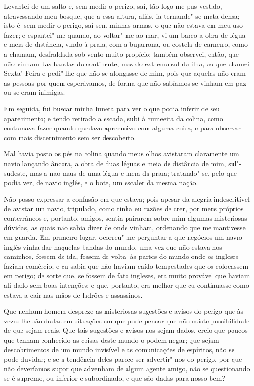 Levantei de um salto e, sem medir o perigo, saí, tão logo me pus
vestido, atravessando meu bosque, que a essa altura, aliás, ia
tornando"-se mata densa; isto é, sem medir o perigo, saí sem minhas
armas, o que não estava em meu uso fazer; e espantei"-me quando, ao
voltar"-me ao mar, vi um barco a obra de légua e meia de distância, vindo
à praia, com a bujarrona, ou costela de carneiro, como a chamam,
desfraldada sob vento muito propício: também observei, então, que não
vinham das bandas do continente, mas do extremo sul da ilha; ao que
chamei Sexta"-Feira e pedi"-lhe que não se alongasse de mim, pois que
aquelas não eram as pessoas por quem esperávamos, de forma que não
sabíamos se vinham em paz ou se eram inimigas.

Em seguida, fui buscar minha luneta para ver o que podia inferir de seu
aparecimento; e tendo retirado a escada, subi à cumeeira da colina, como
costumava fazer quando quedava apreensivo com alguma coisa, e para
observar com mais discernimento sem ser descoberto.

Mal havia posto os pés na colina quando meus olhos avistaram claramente
um navio lançando âncora, a obra de duas léguas e meia de distância de
mim, sul"-sudeste, mas a não mais de uma légua e meia da praia;
tratando"-se, pelo que podia ver, de navio inglês, e o bote, um escaler
da mesma nação.

Não posso expressar a confusão em que estava; pois apesar da alegria
indescritível de avistar um navio, tripulado, como tinha eu razões de
crer, por meus próprios conterrâneos e, portanto, amigos, sentia
pairarem sobre mim algumas misteriosas dúvidas, as quais não sabia dizer
de onde vinham, ordenando que me mantivesse em guarda. Em primeiro
lugar, ocorreu"-me perguntar a que negócios um navio inglês vinha dar
naquelas bandas do mundo, uma vez que não estava nos caminhos, fossem de
ida, fossem de volta, às partes do mundo onde os ingleses faziam
comércio; e eu sabia que não haviam caído tempestades que os colocassem
em perigo; de sorte que, se fossem de fato ingleses, era muito provável
que haviam ali dado sem boas intenções; e que, portanto, era melhor que
eu continuasse como estava a cair nas mãos de ladrões e assassinos.

Que nenhum homem despreze as misteriosas sugestões e avisos do perigo
que às vezes lhe são dadas em situações em que pode pensar que não
existe possibilidade de que sejam reais. Que tais sugestões e avisos nos
sejam dados, creio que poucos que tenham conhecido as coisas deste mundo
o podem negar; que sejam descobrimentos de um mundo invisível e as
comunicações de espíritos, não se pode duvidar; e se a tendência deles
parece ser advertir"-nos do perigo, por que não deveríamos supor que
advenham de algum agente amigo, não se questionando se é supremo, ou
inferior e subordinado, e que são dadas para nosso bem?

